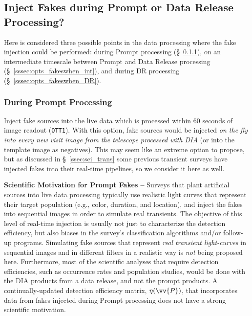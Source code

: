 \documentclass[DM,lsstdraft,toc]{lsstdoc}
\begin{document}
\subsection{Inject Fakes during Prompt or Data Release Processing?}\label{ssec:opts_fakeswhen}

Here is considered three possible points in the data processing where the fake injection could be performed: during Prompt processing (\S~\ref{sssec:opts_fakeswhen_PP}), on an intermediate timescale between Prompt and Data Release processing (\S~\ref{sssec:opts_fakeswhen_int}), and during DR processing (\S~\ref{sssec:opts_fakeswhen_DR}).

\subsubsection{During Prompt Processing}\label{sssec:opts_fakeswhen_PP}

Inject fake sources into the live data which is processed within 60 seconds of image readout ({\tt OTT1}). With this option, fake sources would be injected {\it on the fly into every new visit image from the telescope processed with DIA} (or into the template image as negatives). This may seem like an extreme option to propose, but as discussed in \S~\ref{ssec:sci_trans} some previous transient surveys have injected fakes into their real-time pipelines, so we consider it here as well. 

{\bf Scientific Motivation for Prompt Fakes --} Surveys that plant artificial sources into live data processing typically use realistic light curves that represent their target population (e.g., color, duration, and location), and inject the fakes into sequential images in order to simulate real transients. The objective of this level of real-time injection is usually not just to characterize the detection efficiency, but also biases in the survey's classification algorithms and/or follow-up programs. Simulating fake sources that represent {\it real transient light-curves} in sequential images and in different filters in a realistic way is {\it not} being proposed here. Furthermore, most of the scientific analyses that require detection efficiencies, such as occurrence rates and population studies, would be done with the DIA products from a data release, and not the prompt products. A continually-updated detection efficiency matrix, $\eta(\vv{P})$, that incorporates data from fakes injected during Prompt processing does not have a strong scientific motivation.
\end{document}
